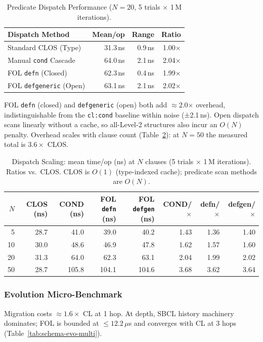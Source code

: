 \documentclass[sigconf,nonacm]{acmart}
\begin{document}
\begin{table}[htbp]
\centering
\small
\caption{Predicate Dispatch Performance ($N=20$, 5 trials $\times$ 1\,M iterations).}
\label{tab:dispatch-perf}
\begin{tabular}{lrrr}
\toprule
\textbf{Dispatch Method} & \textbf{Mean/op} & \textbf{Range} & \textbf{Ratio} \\
\midrule
Standard CLOS (Type)             & 31.3\,ns & 0.9\,ns & 1.00$\times$ \\
Manual \texttt{cond} Cascade     & 64.0\,ns & 2.1\,ns & 2.04$\times$ \\
FOL \texttt{defn} (Closed)       & 62.3\,ns & 0.4\,ns & 1.99$\times$ \\
FOL \texttt{defgeneric} (Open)   & 63.1\,ns & 2.1\,ns & 2.02$\times$ \\
\bottomrule
\end{tabular}
\end{table}

FOL \texttt{defn} (closed) and \texttt{defgeneric} (open) both add $\approx$2.0$\times$ overhead, indistinguishable from the \texttt{cl:cond} baseline within noise (±2.1\,ns).
Open dispatch scans linearly without a cache, so all-Level-2 structures also incur an $O(N)$ penalty.
Overhead scales with clause count (Table~\ref{tab:dispatch-scaling}): at $N=50$ the measured total is $3.6{\times}$ CLOS.

\begin{table}[t]
\centering
\small
\caption{Dispatch Scaling: mean time/op (ns) at $N$ clauses (5 trials $\times$ 1\,M iterations). Ratios vs.\ CLOS.
CLOS is $O(1)$ (type-indexed cache); predicate scan methods are $O(N)$.}
\label{tab:dispatch-scaling}
\begin{tabular}{rrrrrrrr}
\toprule
$N$ & \textbf{CLOS (ns)} & \textbf{COND (ns)} & \textbf{FOL \texttt{defn} (ns)} & \textbf{FOL \texttt{defgen} (ns)} & \textbf{COND/$\times$} & \textbf{defn/$\times$} & \textbf{defgen/$\times$} \\
\midrule
 5 & 28.7 & 41.0 & 39.0 & 40.2 & 1.43 & 1.36 & 1.40 \\
10 & 30.0 & 48.6 & 46.9 & 47.8 & 1.62 & 1.57 & 1.60 \\
20 & 31.3 & 64.0 & 62.3 & 63.1 & 2.04 & 1.99 & 2.02 \\
50 & 28.7 & 105.8 & 104.1 & 104.6 & 3.68 & 3.62 & 3.64 \\
\bottomrule
\end{tabular}
\end{table}

\subsubsection{Evolution Micro-Benchmark}
\label{sec:evobench}
Migration costs ${\approx}1.6{\times}$ CL at 1 hop.
At depth, SBCL history machinery dominates; FOL is bounded at $\le 12.2\,\mu$s and converges with CL at 3 hops (Table~\ref{tab:schema-evo-multi}).
\end{document}
